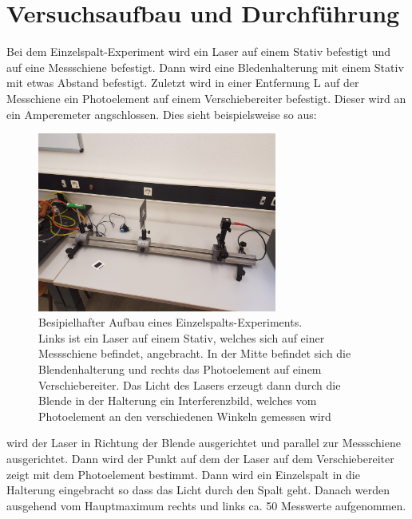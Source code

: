 \section{Versuchsaufbau und Durchführung}
Bei dem Einzelspalt-Experiment wird ein Laser auf einem Stativ befestigt und auf 
eine Messschiene befestigt. Dann wird eine Bledenhalterung mit einem Stativ 
mit etwas Abstand befestigt. Zuletzt wird in einer Entfernung L auf der Messchiene
ein Photoelement auf einem Verschiebereiter befestigt. Dieser wird an ein Amperemeter
angschlossen. Dies sieht beispielsweise so aus:
\begin{figure}[H]
    \centering
    \includegraphics[width=0.7\textwidth]{images/aufbau.jpg}
    \caption{Besipielhafter Aufbau eines Einzelspalts-Experiments.\\
    Links ist ein Laser auf einem Stativ, welches sich auf einer Messschiene befindet, angebracht.
    In der Mitte befindet sich die Blendenhalterung und rechts das Photoelement auf einem 
    Verschiebereiter. Das Licht des Lasers erzeugt dann durch die Blende in der Halterung 
    ein Interferenzbild, welches vom Photoelement an den verschiedenen Winkeln gemessen wird
    }
    \label{fig:3}
\end{figure}
\justifying wird der Laser in Richtung der Blende ausgerichtet und parallel zur Messschiene
ausgerichtet. Dann wird der Punkt auf dem der Laser auf dem Verschiebereiter zeigt mit dem
Photoelement bestimmt. Dann wird ein Einzelspalt in die Halterung eingebracht so dass
das Licht durch den Spalt geht. Danach werden ausgehend vom Hauptmaximum rechts und links 
ca. 50 Messwerte aufgenommen.

